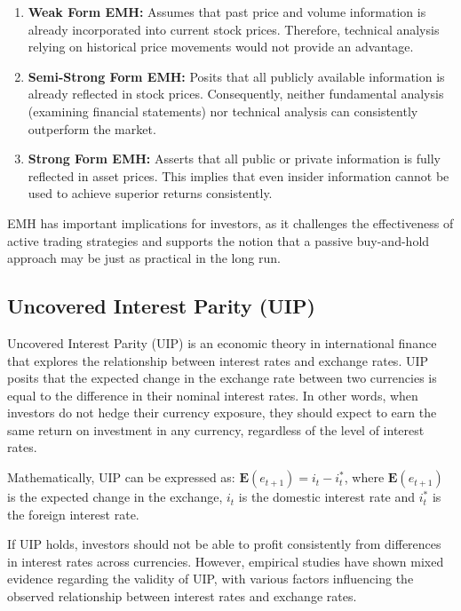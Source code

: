 \documentclass[a4paper,10pt]{article}
\begin{document}
\begin{enumerate}
  \item \textbf{Weak Form EMH:} Assumes that past price and volume information is already incorporated into current stock prices. Therefore, technical analysis relying on historical price movements would not provide an advantage.

  \item \textbf{Semi-Strong Form EMH:} Posits that all publicly available information is already reflected in stock prices. Consequently, neither fundamental analysis (examining financial statements) nor technical analysis can consistently outperform the market.

  \item \textbf{Strong Form EMH:} Asserts that all public or private information is fully reflected in asset prices. This implies that even insider information cannot be used to achieve superior returns consistently.
\end{enumerate}

EMH has important implications for investors, as it challenges the effectiveness of active trading strategies and supports the notion that a passive buy-and-hold approach may be just as practical in the long run.

\subsection{Uncovered Interest Parity (UIP)}\label{appx:uip}

Uncovered Interest Parity (UIP) is an economic theory in international finance that explores the relationship between interest rates and exchange rates. UIP posits that the expected change in the exchange rate between two currencies is equal to the difference in their nominal interest rates. In other words, when investors do not hedge their currency exposure, they should expect to earn the same return on investment in any currency, regardless of the level of interest rates.

Mathematically, UIP can be expressed as: $ \mathbf{E}(e_{t+1}) = i_t - i^*_t $, where \( \mathbf{E}(e_{t+1}) \) is the expected change in the exchange, \( i_t \) is the domestic interest rate and \( i^*_t \) is the foreign interest rate.

If UIP holds, investors should not be able to profit consistently from differences in interest rates across currencies. However, empirical studies have shown mixed evidence regarding the validity of UIP, with various factors influencing the observed relationship between interest rates and exchange rates.
\end{document}
